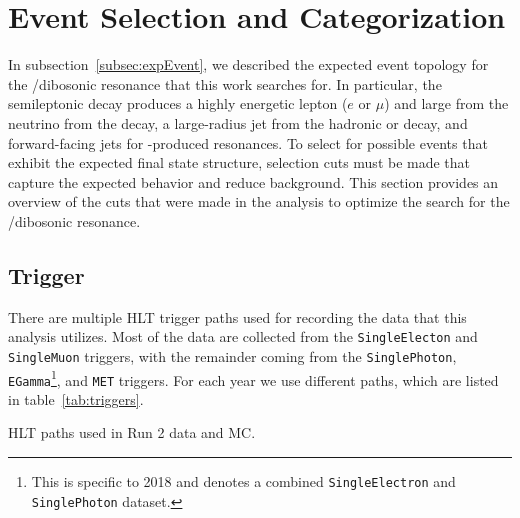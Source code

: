 
\section{Event Selection and Categorization}
\label{sec:events}

In subsection~\ref{subsec:expEvent}, we described the expected event topology for the \WV/\WH dibosonic resonance that this work searches for.
In particular, the semileptonic decay produces a highly energetic lepton ($e$ or $\mu$) and large \ptmiss from the neutrino from the \Wtolnu decay, a large-radius jet from the hadronic \Vtoqqbarpr or \Htobbbar decay, and forward-facing \VBF jets for \VBF-produced resonances.
To select for possible events that exhibit the expected final state structure, selection cuts must be made that capture the expected behavior and reduce background.
This section provides an overview of the cuts that were made in the analysis to optimize the search for the \WV/\WH dibosonic resonance.

\subsection{Trigger}

There are multiple HLT trigger paths used for recording the data that this analysis utilizes.
Most of the data are collected from the \texttt{SingleElecton} and \texttt{SingleMuon} triggers, with the remainder coming from the \texttt{SinglePhoton}, \texttt{EGamma}\footnote{This is specific to 2018 and denotes a combined \texttt{SingleElectron} and \texttt{SinglePhoton} dataset.}, and \texttt{MET} triggers.
For each year we use different paths, which are listed in table~\ref{tab:triggers}.%

\begin{table}[htbp]
  \centering
  
  \caption{
    HLT paths used in Run 2 data and MC.
  }
  \label{tab:triggers}
\end{table}

%  

%  

